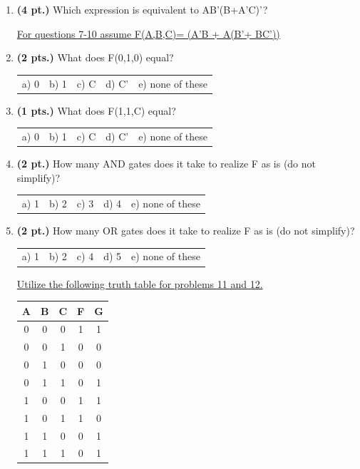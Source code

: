 \documentclass{article}
\begin{document}
\begin{enumerate}
\item {\bf (4 pt.)} Which expression is equivalent to AB'(B+A'C)'?

\pagebreak

\underline{For questions 7-10 assume F(A,B,C)= (A'B + A(B'+ BC'))}

\item {\bf (2 pts.)} What does F(0,1,0) equal?

\begin{tabular}{p{0.7in} p{0.7in} p{0.7in} p{0.7in} l}
a) 0 & b) 1 & c) C & d) C' & e) none of these
\end{tabular}

\item {\bf (1 pts.)} What does F(1,1,C) equal?

\begin{tabular}{p{0.7in} p{0.7in} p{0.7in} p{0.7in} l}
a) 0 & b) 1 & c) C & d) C' & e) none of these
\end{tabular}

\item {\bf (2 pt.)} How many AND gates does it take to realize F
as is (do not simplify)?

\begin{tabular}{p{0.7in} p{0.7in} p{0.7in} p{0.7in} l}
a) 1 & b) 2 & c) 3 & d) 4 & e) none of these
\end{tabular}

\item {\bf (2 pt.)} How many OR gates does it take to realize F
as is (do not simplify)?

\begin{tabular}{p{0.7in} p{0.7in} p{0.7in} p{0.7in} l}
a) 1 & b) 2 & c) 4 & d) 5 & e) none of these
\end{tabular}

\underline{Utilize the following truth table for problems 11 and 12.}

\begin{tabular}{c|c|c||c|c}
A & B & C & F & G \\ \hline \hline
0 & 0 & 0 & 1 & 1 \\ \hline
0 & 0 & 1 & 0 & 0 \\ \hline
0 & 1 & 0 & 0 & 0 \\ \hline
0 & 1 & 1 & 0 & 1 \\ \hline
1 & 0 & 0 & 1 & 1 \\ \hline
1 & 0 & 1 & 1 & 0 \\ \hline
1 & 1 & 0 & 0 & 1 \\ \hline
1 & 1 & 1 & 0 & 1 \\
\end{tabular} 


\end{enumerate}
\end{document}

